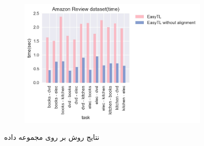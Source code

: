 \begin{figure}
\begin{subfigure}[b]{0.4\textwidth}
		\caption{}
	\end{subfigure}%
	\begin{subfigure}[b]{0.4\textwidth}
		\centering
		\includegraphics[width=\linewidth]{images/1_3.jpg}
		\caption{}
	\end{subfigure}%
	\caption{
		نتایج روش
		 بر روی مجموعه داده
	}
	\label{fig:1}
\end{figure}

